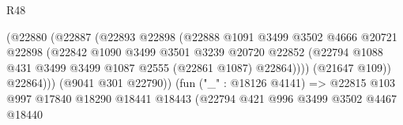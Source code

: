 \begin{lexlean}{R48}
\begin{coremodule}
                                              (@22880
                                                (@22887
                                                  (@22893
                                                    @22898
                                                    (@22888
                                                      @1091
                                                      @3499
                                                      @3502
                                                      @4666
                                                      @20721
                                                      @22898
                                                      (@22842
                                                        @1090
                                                        @3499
                                                        @3501
                                                        @3239
                                                        @20720
                                                        @22852
                                                        (@22794
                                                          @1088
                                                          @431
                                                          @3499
                                                          @3499
                                                          @1087
                                                          @2555
                                                          (@22861 @1087)
                                                          @22864))))
                                                  (@21647 @109))
                                                @22864)))
                                          (@9041 @301 @22790))
                                        (fun ("_" : @18126 @4141) =>
                                        @22815
                                          @103
                                          @997
                                          @17840
                                          @18290
                                          @18441
                                          @18443
                                          (@22794
                                            @421
                                            @996
                                            @3499
                                            @3502
                                            @4467
                                            @18440

\end{coremodule}
\end{lexlean}
